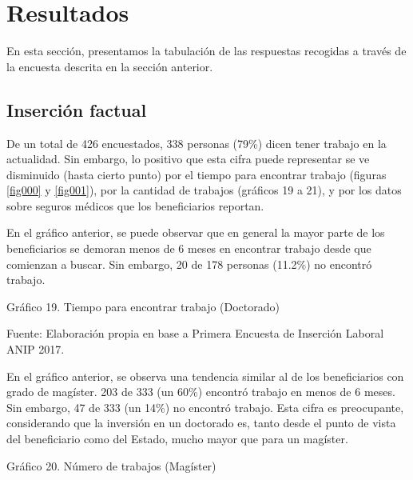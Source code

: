\documentclass{article}
\begin{document}
\section{Resultados}
En esta sección, presentamos la tabulación de las respuestas recogidas a través de la encuesta descrita en la sección anterior.

\subsection{Inserción factual}


De un total de 426 encuestados, 338 personas (79\%) dicen tener trabajo en la actualidad. Sin embargo, lo positivo que esta cifra puede representar se ve disminuido (hasta cierto punto) por el tiempo para encontrar trabajo (figuras \ref{fig000} y \ref{fig001}), por la cantidad de trabajos (gráficos 19 a 21), y por los datos sobre seguros médicos que los beneficiarios reportan.


En el gráfico anterior, se puede observar que en general la mayor parte de los beneficiarios se demoran menos de 6 meses en encontrar trabajo desde que comienzan a buscar. Sin embargo, 20 de 178 personas (11.2\%) no encontró trabajo.

Gráfico 19. Tiempo para encontrar trabajo (Doctorado)


Fuente: Elaboración propia en base a Primera Encuesta de Inserción Laboral ANIP 2017.

En el gráfico anterior, se observa una tendencia similar al de los beneficiarios con grado de magíster. 203 de 333 (un 60\%) encontró trabajo en menos de 6 meses. Sin embargo, 47 de 333 (un 14\%) no encontró trabajo. Esta cifra es preocupante, considerando que la inversión en un doctorado es, tanto desde el punto de vista del beneficiario como del Estado, mucho mayor que para un magíster.

Gráfico 20. Número de trabajos (Magíster)

\end{document}
